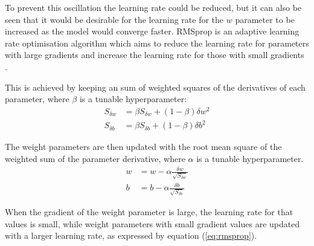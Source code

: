 To prevent this oscillation the learning rate could be reduced, but it can also be seen that it would be desirable for the learning rate for the $w$ parameter to be increased as the model would converge faster.
RMSprop is an adaptive learning rate optimisation algorithm which aims to reduce the learning rate for parameters with large gradients and increase the learning rate for those with small gradients \cite{Goodfellow-et-al-2016}. 

This is achieved by keeping an sum of weighted squares of the derivatives of each parameter, where $\beta$ is a tunable hyperparameter:
\begin{equation*}
    \begin{aligned}
        S_{\delta w} &= \beta S_{\delta w} + (1 - \beta) \delta w^2 \\
        S_{\delta b} &= \beta S_{\delta b} + (1 - \beta) \delta b^2
    \end{aligned}
\end{equation*}

The weight parameters are then updated with the root mean square of the weighted sum of the parameter derivative, where $\alpha$ is a tunable hyperparameter.
\begin{equation}\label{eq:rmsprop}
    \begin{aligned}
        w &= w - \alpha \frac{\delta w}{\sqrt{S_{\delta w}}} \\
        b &= b - \alpha \frac{\delta b}{\sqrt{S_{\delta b}}}
    \end{aligned}
\end{equation}

When the gradient of the weight parameter is large, the learning rate for that values is small, while weight parameters with small gradient values are updated with a larger learning rate, as expressed by equation (\ref{eq:rmsprop}).

